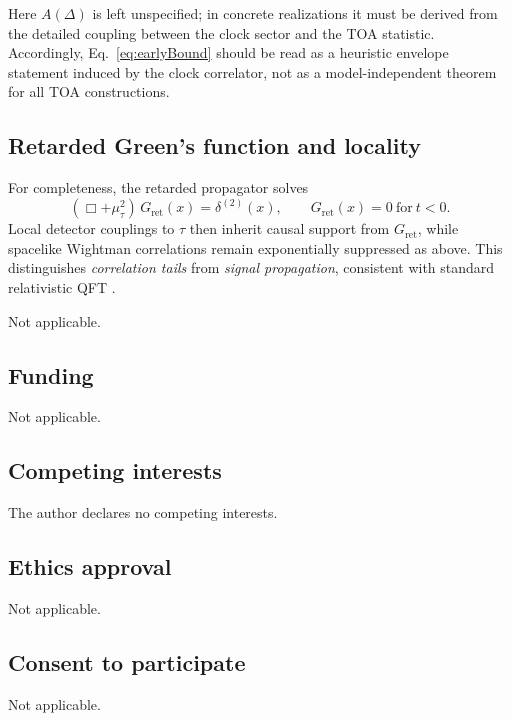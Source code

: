 \documentclass[pdflatex,sn-mathphys-num]{sn-jnl}
\theoremstyle{thmstylethree}
\theoremstyle{thmstyleone}
\theoremstyle{thmstyletwo}
\numberwithin{equation}{section}
\newcommand{\Gret}{G_{\mathrm{ret}}}
\begin{document}
        Here $A(\Delta)$ is left unspecified; in concrete realizations it must be derived from the detailed coupling between the clock sector and the TOA statistic. Accordingly, Eq.~\eqref{eq:earlyBound} should be read as a heuristic envelope statement induced by the clock correlator, not as a model-independent theorem for all TOA constructions.
    
    \subsection{Retarded Green's function and locality}
        
        For completeness, the retarded propagator solves
        \begin{equation}
            (\Box+\mu_\tau^2)\,\Gret(x)=\delta^{(2)}(x),
            \qquad \Gret(x)=0\ \text{for}\ t<0.
        \end{equation}
        Local detector couplings to $\tau$ then inherit causal support from $\Gret$, while spacelike Wightman correlations remain exponentially suppressed as above. This distinguishes \emph{correlation tails} from \emph{signal propagation}, consistent with standard relativistic QFT \cite{Peskin1995,Weinberg1995}.

        
        \backmatter
        
        Not applicable.
        
    
    \subsection*{Funding}
        Not applicable.
    
    \subsection*{Competing interests}
        The author declares no competing interests.
    
    \subsection*{Ethics approval}
        Not applicable.
    
    \subsection*{Consent to participate}
        Not applicable.
    
\end{document}
